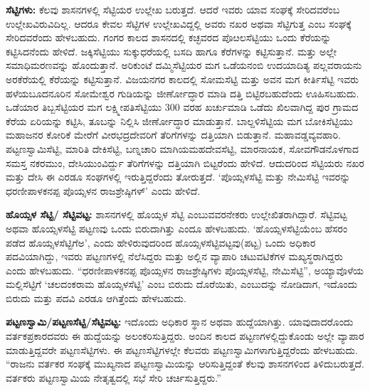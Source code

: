\textbf{ಸೆಟ್ಟಿಗಳು:} ಕೆಲವು ಶಾಸನಗಳಲ್ಲಿ ಸೆಟ್ಟಿಯರ ಉಲ್ಲೇಖ ಬರುತ್ತದೆ. ಆದರೆ ಇವರು ಯಾವ ಸಂಘಕ್ಕೆ ಸೇರಿದವರೆಂಬ ಉಲ್ಲೇಖವಿರುವಿದಿಲ್ಲ. ಆದರೂ ಕೇವಲ ಸೆಟ್ಟಿಗಳ ಉಲ್ಲೇಖವಿದ್ದಲ್ಲಿ ಅವರು ನಖರ ಅಥವಾ ಸೆಟ್ಟಿಗುತ್ತ ಎಂಬ ಸಂಘಕ್ಕೆ ಸೇರಿದವರೆಂದು ಹೇಳಬಹುದು. ಗಂಗರ ಕಾಲದ ಶಾಸನದಲ್ಲಿ ಕಚ್ಛವರದ ಪೊೞಲಸೆಟ್ಟಿಯು ಒಂದು ಕೆರೆಯನ್ನು ಕಟ್ಟಿಸಿದನೆಂದು ಹೇಳಿದೆ. ಜಕ್ಕಿಸೆಟ್ಟಿಯು ಸುಕ್ಕುಧರೆಯಲ್ಲಿ ಬಸದಿ ಹಾಗೂ ಕೆರೆಗಳನ್ನು ಕಟ್ಟಿಸುತ್ತಾನೆ. ಮತ್ತು ಅಲ್ಲೇ ಸಮಾಧಿಮರಣವನ್ನು ಹೊಂದುತ್ತಾನೆ. ಅರಿಕುಂಟೆ ದಮ್ಮಿಸೆಟ್ಟಿಯರ ಮಗ ಒಡೆಯನಂಬಿ ಉದಯಾದಿತ್ಯ ಪಲ್ಲವರಾಯನು ಅರಕೆರೆಯಲ್ಲಿ ಕೆರೆಯನ್ನು ಕಟ್ಟಿಸುತ್ತಾನೆ. ವಿಜಯನಗರ ಕಾಲದಲ್ಲಿ ಸೋಮಸೆಟ್ಟಿ ಮತ್ತು ಅವನ ಮಗ ಕೀರ್ತಿಸೆಟ್ಟಿ ಇವರು ಹಳೆಯಬೂದನೂರಿನ ಸೋಮೇಶ್ವರ ಗುಡಿಯನ್ನು ಜೀರ್ಣೋದ್ಧಾರ ಮಾಡಿ ದತ್ತಿ ಬಿಟ್ಟಿರಬಹುದೆಂದು ಊಹಿಸಬಹುದು. ಒಡೆಯಾರ ತಿಬ್ಬಸೆಟ್ಟಿಯರ ಮಗ ಲಕ್ಷ್ಮೀಪತಿಸೆಟ್ಟಿಯು 300 ವರಹ ಖರ್ಚುಮಾಡಿ ಒಡೆದು ಖಿಲವಾಗಿದ್ದ ಪುರ ಗ್ರಾಮದ ಕೆರೆಯ ಏರಿಯನ್ನು ಕಟ್ಟಿಸಿ, ತೂಬನ್ನು ನಿಲ್ಲಿಸಿ ಜೀರ್ಣೋದ್ಧಾರ ಮಾಡುತ್ತಾನೆ. ಬಾಲ್ದಳಿಸೆಟ್ಟಿಯ ಮಗ ಬೋಕಿಸೆಟ್ಟಿಯು ಮಹಾಜನರ ಕೋರಿಕೆ ಮೇರೆಗೆ ವೀರಭದ್ರದೇವರಿಗೆ ತೆರಿಗೆಗಳನ್ನು ದತ್ತಿಯಾಗಿ ಬಿಡುತ್ತಾನೆ. ಮಹಾವಡ್ಡವ್ಯವಹಾರಿ. ಪಟ್ಟಣಸ್ವಾಮಿಸೆಟ್ಟಿ, ಮಾರಿತಿ ದೇಕಿಸೆಟ್ಟಿ, ಬಣ್ನಚಾರಿ ಮಾಗಿಯಮಹದೇವಸೆಟ್ಟಿ, ಮಾರನಾಯಕ, ಸೋವಗೌಡನೊಳಗಾದ ಸಮಸ್ತ ನಕರಮುಂ, ದೇಸಿಯುಂವಿರ್ದ್ದು ತೆರಿಗೆಗಳನ್ನು ದತ್ತಿಯಾಗಿ ಬಿಟ್ಟರೆಂದು ಹೇಳಿದೆ. ಆದುದರಿಂದ ಸೆಟ್ಟಿಯರು ನಖರ ಮತ್ತು ದೇಸಿ ಈ ಎರಡೂ ಸಂಘಗಳಲ್ಲಿ ಇರುತ್ತಿದ್ದರೆಂದು ತೋರುತ್ತದೆ. ‘ಪೊಯ್ಸಳಸೆಟ್ಟಿ ಮತ್ತು ನೇಮಿಸೆಟ್ಟಿ ಇವರನ್ನು ಧರಣೀಪಾಳಕನಪ್ಪ ಪೊಯ್ಸಳನ ರಾಜಶ್ರೇಷ್ಠಿಗಳ್​’ ಎಂದು ಹೇಳಿದೆ.

\textbf{ಹೊಯ್ಸಳ ಸೆಟ್ಟಿ/ ಸೆಟ್ಟಿವಟ್ಟ: } ಶಾಸನಗಳಲ್ಲಿ ಹೊಯ್ಸಳ ಸೆಟ್ಟಿ ಎಂಬುವವರನೇಕರು ಉಲ್ಲೇಖಿತರಾಗಿದ್ದಾರೆ. ಸೆಟ್ಟಿವಟ್ಟ ಅಥವಾ ಹೊಯ್ಸಳಸೆಟ್ಟಿ ಪಟ್ಟಣವು ಒಂದು ಬಿರುದಾಗಿತ್ತು ಎಂದೂ ಹೇಳಬಹುದು. ‘ಹೊಯ್ಸಳಸೆಟ್ಟಿಯೆಂಬ ಹೆಸರಂ ಪಡೆದ ಹೊಯ್ಸಳಸೆಟ್ಟಿಗೆಅ’, ಎಂದು ಹೇಳಿರುವುದರಿಂದ ಹೊಯ್ಸಳಸೆಟ್ಟಿವಟ್ಟವು(ಪಟ್ಟ) ಒಂದು ಅಧಿಕಾರ ಪದವಿಯಾಗಿದ್ದು, ಇವರು ಪಟ್ಟಣಗಳಲ್ಲಿ ನೆಲೆಸಿದ್ದರು ಮತ್ತು ಅಲ್ಲಿನ ವ್ಯಾಪಾರಿ ಚಟುವಟಿಕೆಗಳ ಮಖ್ಯಸ್ಥರಾಗಿದ್ದರು ಎಂದು ಹೇಳಬಹುದು. “ಧರಣೀಪಾಳಕನಪ್ಪ ಪೊಯ್ಸಳನ ರಾಜಶ್ರೇಷ್ಠಿಗಳು ಪೊಯ್ಸಳಸೆಟ್ಟಿ, ನೇಮಿಸೆಟ್ಟಿ”, ಅಯ್ಯಾವೊಳೆಯ ಮಲ್ಲಿಸೆಟ್ಟಿಗೆ ‘ಚಲದಂಕರಾಮ ಹೊಯ್ಸಳಸೆಟ್ಟಿ’ ಎಂಬ ಬಿರುದು ದೊರೆಯಿತು, ಎಂಬುದನ್ನು ನೋಡಿದಾಗ, ಇದೊಂದು ಬಿರುದು ಮತ್ತು ಪದವಿ ಎರಡೂ ಆಗಿತ್ತೆಂದು ಹೇಳಬಹುದು.

\textbf{ಪಟ್ಟಣಸ್ವಾಮಿ/ಪಟ್ಟಣಸೆಟ್ಟಿ/ಸೆಟ್ಟಿವಟ್ಟ: } ಇದೊಂದು ಅಧಿಕಾರ ಸ್ಥಾನ ಅಥವಾ ಹುದ್ದೆಯಾಗಿತ್ತು. ಯಾವುದಾದರೊಂದು ವರ್ತಕಪ್ರಕಾರದವರು ಈ ಹುದ್ದೆಯನ್ನು ಅಲಂಕರಿಸುತ್ತಿದ್ದರು. ಅಂದಿನ ಕಾಲದ ಪಟ್ಟಣಗಳಲ್ಲಿದ್ದುಕೊಂಡು ಅಲ್ಲೇ ವ್ಯಾಪಾರ ಮಾಡುತ್ತಿದ್ದವರೇ ಪಟ್ಟಣಸೆಟ್ಟಿಗಳು. ಈ ಪಟ್ಟಣಸೆಟ್ಟಿಗಳಲ್ಲೇ ಕೆಲವರು ಪಟ್ಟಣಸ್ವಾಮಿಗಳಾಗುತ್ತಿದ್ದರೆಂದು ಹೇಳಬಹುದು. “ರಾಜನು ವರ್ತಕರ ಸಂಘಕ್ಕೆ ಮುಖ್ಯನಾದ ಪಟ್ಟಣಸ್ವಾಮಿಯನ್ನು ಆರಿಸುತ್ತಿದ್ದಂತೆ ಕೆಲವು ಶಾಸನಗಳಿಂದ ತಿಳಿದುಬರುತ್ತದೆ. ವರ್ತಕರು ಪಟ್ಟಣಸ್ವಾಮಿಯ ನೇತೃತ್ವದಲ್ಲಿ ಸಭೆ ಸೇರಿ ಚರ್ಚಿಸುತ್ತಿದ್ದರು.”

